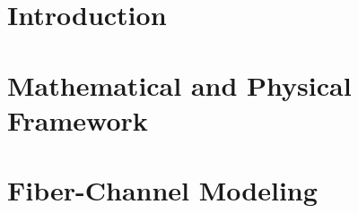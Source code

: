 \documentclass{Configuration_Files/PoliMi3i_thesis}
\begin{document}
\tableofcontents

\thispagestyle{empty}

\cleardoublepage



\mainmatter


\chapter*{Introduction}



\chapter{Mathematical and Physical Framework}

\label{ch:01_mathematical_and_physical_framework}



\chapter{Fiber-Channel Modeling}

\label{ch:02_fiber_channel_modeling}


% 

\end{document}
